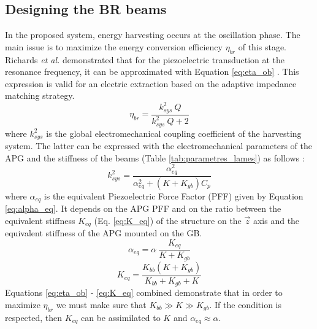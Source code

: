 \documentclass[3p,twocolumn,preprint]{elsarticle}
\begin{document}
	\subsection{Designing the BR beams}	
	\label{subsec:BR beams design}
In the proposed system, energy harvesting occurs at the oscillation phase. The main issue is to maximize the energy conversion efficiency $\eta_{br}$ of this stage. Richards \emph{et al.} demonstrated that for the piezoelectric transduction at the resonance frequency, it can be approximated with Equation \ref{eq:eta_ob} \cite{Richards2004}. This expression is valid for an electric extraction based on the adaptive impedance matching strategy.
\begin{equation}
	\eta_{br} = \dfrac{k^2_{sys}\ Q}{k^2_{sys}\ Q + 2}
	\label{eq:eta_ob}
\end{equation}
where $k^2_{sys}$ is the global electromechanical coupling coefficient of the harvesting system. The latter can be expressed with the electromechanical parameters of the APG and the stiffness of the beams (Table \ref{tab:parametres_lames}) as follows :
\begin{equation}
	k^2_{sys} = \dfrac{\alpha^2_{eq}}{\alpha^2_{eq} + (K+K_{gb})C_p}
	\label{eq:k2_sys}
\end{equation}
where $\alpha_{eq}$ is the equivalent Piezoelectric Force Factor (PFF) given by Equation \ref{eq:alpha_eq}. It depends on the APG PFF and on the ratio between the equivalent stiffness $K_{eq}$ (Eq. \ref{eq:K_eq}) of the structure on the $\vec{z}$ axis and the equivalent stiffness of the APG mounted on the GB.
\begin{equation}
	\alpha_{eq} = \alpha\ \dfrac{K_{eq}}{K + K_{gb}} 
	\label{eq:alpha_eq}
\end{equation}
\begin{equation}
	K_{eq} = \dfrac{K_{bb}(K + K_{gb})}{K_{bb} + K_{gb} + K}
	\label{eq:K_eq}
\end{equation}
Equations \ref{eq:eta_ob} - \ref{eq:K_eq} combined demonstrate that in order to maximize $\eta_{br}$ we must make sure that $K_{bb} \gg K \gg K_{gb}$. If the condition is respected, then $K_{eq}$ can be assimilated to $K$ and $\alpha_{eq} \approx \alpha$.
\end{document}
